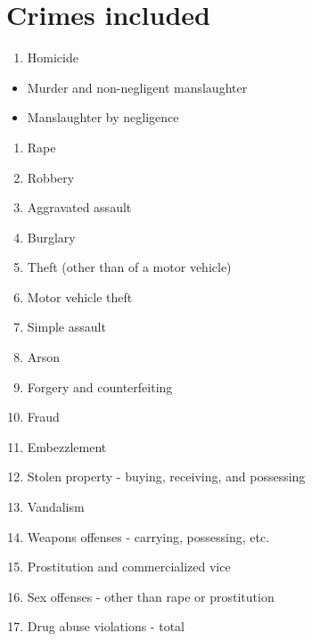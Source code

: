 \documentclass[
  12pt,
  openany]{book}
\providecommand{\tightlist}{%
  \setlength{\itemsep}{0pt}\setlength{\parskip}{0pt}}
\begin{document}
\hypertarget{crimes-included}{%
\section{Crimes included}\label{crimes-included}}

\begin{enumerate}
\def\labelenumi{\arabic{enumi}.}
\tightlist
\item
  Homicide
\end{enumerate}

\begin{itemize}
\tightlist
\item
  Murder and non-negligent manslaughter
\item
  Manslaughter by negligence
\end{itemize}

\begin{enumerate}
\def\labelenumi{\arabic{enumi}.}
\setcounter{enumi}{1}
\tightlist
\item
  Rape
\item
  Robbery
\item
  Aggravated assault
\item
  Burglary
\item
  Theft (other than of a motor vehicle)
\item
  Motor vehicle theft
\item
  Simple assault
\item
  Arson
\item
  Forgery and counterfeiting
\item
  Fraud
\item
  Embezzlement
\item
  Stolen property - buying, receiving, and possessing
\item
  Vandalism
\item
  Weapons offenses - carrying, possessing, etc.
\item
  Prostitution and commercialized vice
\item
  Sex offenses - other than rape or prostitution
\item
  Drug abuse violations - total
\end{enumerate}
\end{document}
